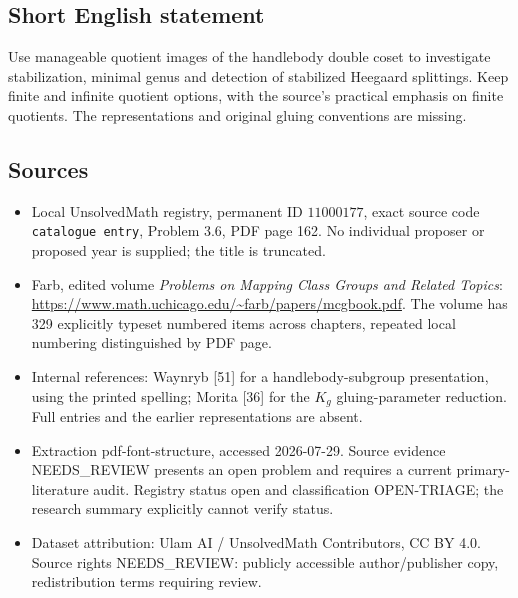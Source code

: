 \documentclass[11pt]{article}
\begin{document}
\subsection{Short English statement}
Use manageable quotient images of the handlebody double coset to investigate stabilization, minimal genus and detection of stabilized Heegaard splittings. Keep finite and infinite quotient options, with the source's practical emphasis on finite quotients. The representations and original gluing conventions are missing.
\subsection{Sources}
\begin{itemize}
\item Local UnsolvedMath registry, permanent ID \(11000177\), exact source code \texttt{catalogue entry}, Problem 3.6, PDF page 162. No individual proposer or proposed year is supplied; the title is truncated.
\item Farb, edited volume \emph{Problems on Mapping Class Groups and Related Topics}: \url{https://www.math.uchicago.edu/~farb/papers/mcgbook.pdf}. The volume has 329 explicitly typeset numbered items across chapters, repeated local numbering distinguished by PDF page.
\item Internal references: Waynryb [51] for a handlebody-subgroup presentation, using the printed spelling; Morita [36] for the \(K_g\) gluing-parameter reduction. Full entries and the earlier representations are absent.
\item Extraction pdf-font-structure, accessed 2026-07-29. Source evidence NEEDS\_REVIEW presents an open problem and requires a current primary-literature audit. Registry status open and classification OPEN-TRIAGE; the research summary explicitly cannot verify status.
\item Dataset attribution: Ulam AI / UnsolvedMath Contributors, CC BY 4.0. Source rights NEEDS\_REVIEW: publicly accessible author/publisher copy, redistribution terms requiring review.
\end{itemize}
\end{document}
